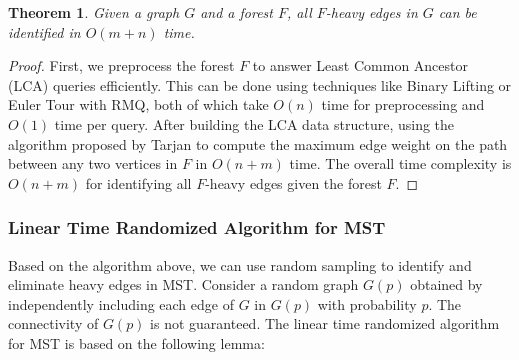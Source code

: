 \documentclass[11pt]{article}
\theoremstyle{plain}
\newtheorem{theorem}{Theorem}[section]
\begin{document}
\begin{theorem}
    \label{theorem:heavy}
    Given a graph $G$ and a forest $F$, all $F$-heavy edges in $G$ can be identified in $O(m+n)$ time.
\end{theorem}
\begin{proof}
    First, we preprocess the forest $F$ to answer Least Common Ancestor (LCA) queries efficiently. This can be done using techniques like Binary Lifting or Euler Tour with RMQ, both of which take $O(n)$ time for preprocessing and $O(1)$ time per query\cite{bender2000lca}. After building the LCA data structure, using the algorithm proposed by Tarjan\cite{doi:10.1137/0221070} to compute the maximum edge weight on the path between any two vertices in $F$ in $O(n+m)$ time. The overall time complexity is $O(n + m)$ for identifying all $F$-heavy edges given the forest $F$.
\end{proof}

\subsubsection{Linear Time Randomized Algorithm for MST}

Based on the algorithm above, we can use random sampling to identify and eliminate heavy edges in MST. Consider a random graph $G(p)$ obtained by independently including each edge of $G$ in $G(p)$ with probability $p$. The connectivity of $G(p)$ is not guaranteed. The linear time randomized algorithm for MST is based on the following lemma:
\end{document}
